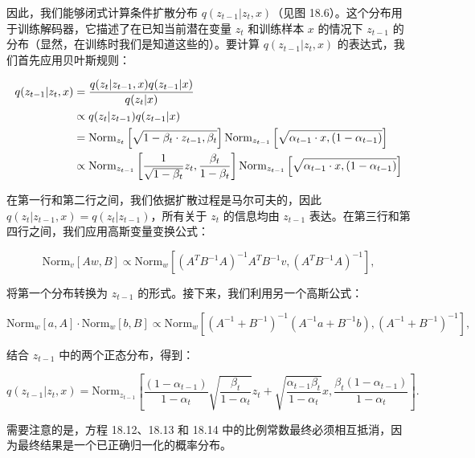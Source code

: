 \documentclass[lang=cn,newtx,10pt,scheme=chinese]{elegantbook}
\begin{document}
因此，我们能够闭式计算条件扩散分布 \(q(z_{t-1}|z_t, x)\)（见图 18.6）。这个分布用于训练解码器，它描述了在已知当前潜在变量 \(z_t\) 和训练样本 \(x\) 的情况下 \(z_{t-1}\) 的分布（显然，在训练时我们是知道这些的）。要计算 \(q(z_{t-1}|z_t, x)\) 的表达式，我们首先应用贝叶斯规则：



\begin{align}
q(z_{t-1}|z_t, x) &= \frac{q(z_t|z_{t-1}, x)q(z_{t-1}|x)}{q(z_t|x)} \notag \\
&\propto q(z_t|z_{t-1})q(z_{t-1}|x) \notag \\
&= \text{Norm}_{z_t} \left[ \sqrt{1 - \beta_t \cdot z_{t-1}, \beta_t} \right] \text{Norm}_{z_{t-1}} \left[ \sqrt{\alpha_{t-1} \cdot x, (1 - \alpha_{t-1})} \right] \notag \\
&\propto \text{Norm}_{z_{t-1}} \left[ \frac{1}{\sqrt{1 - \beta_t}} z_t, \frac{\beta_t}{1 - \beta_t} \right] \text{Norm}_{z_{t-1}} \left[ \sqrt{\alpha_{t-1} \cdot x, (1 - \alpha_{t-1})} \right] 
\end{align} 


在第一行和第二行之间，我们依据扩散过程是马尔可夫的，因此 \(q(z_t|z_{t-1}, x) = q(z_t|z_{t-1})\)，所有关于 \(z_t\) 的信息均由 \(z_{t-1}\) 表达。在第三行和第四行之间，我们应用高斯变量变换公式：

\begin{equation}
\text{Norm}_{v} [Aw, B] \propto \text{Norm}_{w} \left[ (A^T B^{-1} A)^{-1} A^T B^{-1} v, (A^T B^{-1} A)^{-1} \right], 
\end{equation}

将第一个分布转换为 \(z_{t-1}\) 的形式。接下来，我们利用另一个高斯公式：

\begin{equation}
\text{Norm}_{w}[a, A] \cdot \text{Norm}_{w}[b, B] \propto \text{Norm}_{w} \left[ (A^{-1} + B^{-1})^{-1} (A^{-1} a + B^{-1} b), (A^{-1} + B^{-1})^{-1} \right], 
\end{equation}

结合 \(z_{t-1}\) 中的两个正态分布，得到：

\begin{equation}
q(z_{t-1}|z_t, x) = \text{Norm}_{z_{t-1}} \left[
\frac{(1 - \alpha_{t-1})}{1 - \alpha_t} \sqrt{\frac{\beta_t}{1 - \alpha_t}} z_t + \sqrt{\frac{\alpha_{t-1}\beta_t}{1 - \alpha_t}} x, 
\frac{\beta_t (1 - \alpha_{t-1})}{1 - \alpha_t} 
\right]. 
\end{equation}

需要注意的是，方程 18.12、18.13 和 18.14 中的比例常数最终必须相互抵消，因为最终结果是一个已正确归一化的概率分布。
\end{document}
